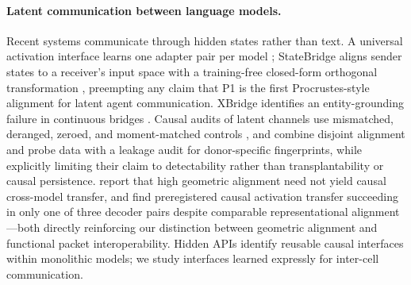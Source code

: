 \documentclass[11pt]{article}
\begin{document}
\paragraph{Latent communication between language models.}
Recent systems communicate through hidden states rather than text. A universal activation interface learns one adapter pair per model \citep{kim2026adapter}; StateBridge aligns sender states to a receiver's input space with a training-free closed-form orthogonal transformation \citep{peng2026statebridge}, preempting any claim that P1 is the first Procrustes-style alignment for latent agent communication. XBridge identifies an entity-grounding failure in continuous bridges \citep{yang2026xbridge}. Causal audits of latent channels use mismatched, deranged, zeroed, and moment-matched controls \citep{zhang2026latent,cheng2026kv}, and \citet{truong2026gauge} combine disjoint alignment and probe data with a leakage audit for donor-specific fingerprints, while explicitly limiting their claim to detectability rather than transplantability or causal persistence. \citet{zhang2026pythia} report that high geometric alignment need not yield causal cross-model transfer, and \citet{cardenas2026causal} find preregistered causal activation transfer succeeding in only one of three decoder pairs despite comparable representational alignment---both directly reinforcing our distinction between geometric alignment and functional packet interoperability. Hidden APIs \citep{ma2026hidden} identify reusable causal interfaces within monolithic models; we study interfaces learned expressly for inter-cell communication.
\end{document}
